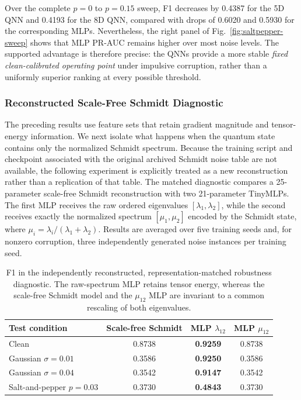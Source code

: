 \documentclass[11pt]{article}
\begin{document}
Over the complete $p=0$ to $p=0.15$ sweep, F1 decreases by 0.4387 for the 5D
QNN and 0.4193 for the 8D QNN, compared with drops of 0.6020 and 0.5930 for
the corresponding MLPs.  Nevertheless, the right panel of
Fig.~\ref{fig:saltpepper-sweep} shows that MLP PR-AUC remains higher over most
noise levels.  The supported advantage is therefore precise: the QNNs provide
a more stable \emph{fixed clean-calibrated operating point} under impulsive
corruption, rather than a uniformly superior ranking at every possible
threshold.

\subsubsection{Reconstructed Scale-Free Schmidt Diagnostic}
\label{sec:representation-robustness}

The preceding results use feature sets that retain gradient magnitude and
tensor-energy information.  We next isolate what happens when the quantum
state contains only the normalized Schmidt spectrum.  Because the training
script and checkpoint associated with the original archived Schmidt noise
table are not available, the following experiment is explicitly treated as a
new reconstruction rather than a replication of that table.  The matched
diagnostic compares a 25-parameter scale-free Schmidt reconstruction with two
21-parameter TinyMLPs.  The first MLP receives the raw ordered eigenvalues
$[\lambda_1,\lambda_2]$, while the second receives exactly the normalized
spectrum $[\mu_1,\mu_2]$ encoded by the Schmidt state, where
$\mu_i=\lambda_i/(\lambda_1+\lambda_2)$.  Results are averaged over five
training seeds and, for nonzero corruption, three independently generated
noise instances per training seed.

\begin{table}[H]
    \centering
    \caption{F1 in the independently reconstructed, representation-matched
    robustness diagnostic.  The raw-spectrum MLP retains tensor energy,
    whereas the scale-free Schmidt model and the $\mu_{12}$ MLP are invariant
    to a common rescaling of both eigenvalues.}
    \label{tab:schmidt-noise-diagnostic}
    \small
    \begin{tabular}{lccc}
        \toprule
        Test condition & Scale-free Schmidt & MLP $\lambda_{12}$ & MLP $\mu_{12}$ \\
        \midrule
        Clean & 0.8738 & \textbf{0.9259} & 0.8738 \\
        Gaussian $\sigma=0.01$ & 0.3586 & \textbf{0.9250} & 0.3586 \\
        Gaussian $\sigma=0.04$ & 0.3542 & \textbf{0.9147} & 0.3542 \\
        Salt-and-pepper $p=0.03$ & 0.3730 & \textbf{0.4843} & 0.3730 \\
        \bottomrule
    \end{tabular}
\end{table}
\end{document}
